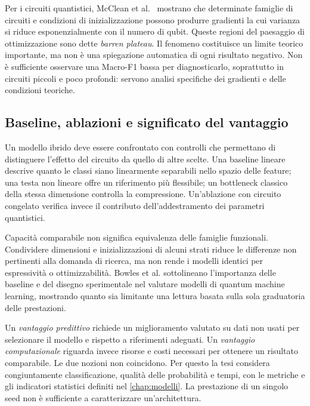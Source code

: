 Per i circuiti quantistici, McClean et al.~\cite{mcclean2018barren}
mostrano che determinate famiglie di circuiti e condizioni di
inizializzazione possono produrre gradienti la cui varianza si riduce
esponenzialmente con il numero di qubit. Queste regioni del paesaggio di
ottimizzazione sono dette \emph{barren plateau}. Il fenomeno costituisce
un limite teorico importante, ma non è una spiegazione automatica di
ogni risultato negativo. Non è sufficiente osservare una Macro-F1 bassa
per diagnosticarlo, soprattutto in circuiti piccoli e poco profondi:
servono analisi specifiche dei gradienti e delle condizioni teoriche.

\subsection{Baseline, ablazioni e significato del vantaggio}

Un modello ibrido deve essere confrontato con controlli che permettano
di distinguere l'effetto del circuito da quello di altre scelte. Una
baseline lineare descrive quanto le classi siano linearmente separabili
nello spazio delle feature; una
testa non lineare offre un riferimento più flessibile; un bottleneck
classico della stessa dimensione controlla la compressione. Un'ablazione
con circuito congelato verifica invece il contributo
dell'addestramento dei parametri quantistici.

Capacità comparabile non significa equivalenza delle famiglie funzionali.
Condividere dimensioni e inizializzazioni di alcuni strati riduce le
differenze non pertinenti alla domanda di ricerca, ma non rende i modelli
identici per espressività o ottimizzabilità. Bowles et al.
\cite{bowles2024benchmarking} sottolineano l'importanza delle baseline
e del disegno sperimentale nel valutare modelli di quantum machine
learning, mostrando quanto sia limitante una lettura basata sulla sola
graduatoria delle prestazioni.

Un \emph{vantaggio predittivo} richiede un miglioramento valutato su dati
non usati per selezionare il modello e rispetto a riferimenti adeguati.
Un \emph{vantaggio computazionale} riguarda invece risorse e costi
necessari per ottenere un risultato comparabile. Le due nozioni non
coincidono. Per questo la tesi considera congiuntamente classificazione,
qualità delle probabilità e tempi, con le metriche e gli indicatori
statistici definiti nel \cref{chap:modelli}. La prestazione di un singolo
seed non è sufficiente a caratterizzare un'architettura.


